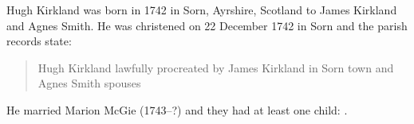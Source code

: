 
Hugh Kirkland was born in 1742 in Sorn, Ayrshire, Scotland to James Kirkland and Agnes Smith.  He was christened on
22 December 1742 in Sorn and the parish records state:\cite{HKirklandBirth}

\begin{quotation}
Hugh Kirkland lawfully procreated by James Kirkland in Sorn town and Agnes Smith spouses
\end{quotation}

He married Marion McGie (1743--?) and they had at least one child: .

